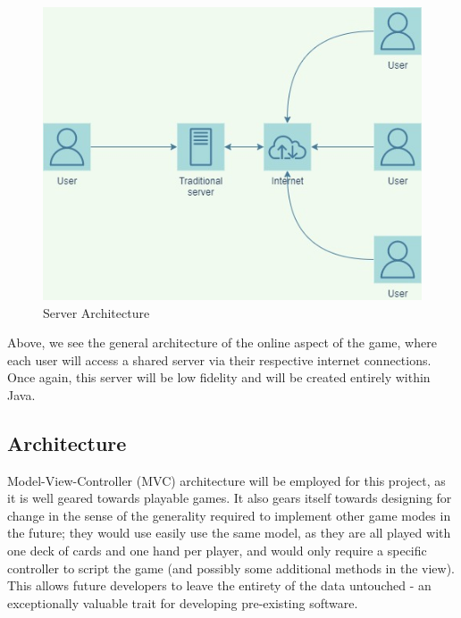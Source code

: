 \documentclass[12pt, titlepage]{article}
\begin{document}
    \begin{figure}
        \includegraphics[width=14cm]{implementation_environment (1).jpg}
        \caption{Server Architecture}
    \end{figure}

\bigskip

Above, we see the general architecture of the online aspect of the game, where each user will access a shared server via their respective internet connections. Once again, this server will be low fidelity and will be created entirely within Java. 

\subsection{Architecture}

Model-View-Controller (MVC) architecture will be employed for this project, as it is well geared towards playable games. It also gears itself towards designing for change in the sense of the generality required to implement other game modes in the future; they would use easily use the same model, as they are all played with one deck of cards and one hand per player, and would only require a specific controller to script the game (and possibly some additional methods in the view). This allows future developers to leave the entirety of the data untouched - an exceptionally valuable trait for developing pre-existing software. 
\end{document}
